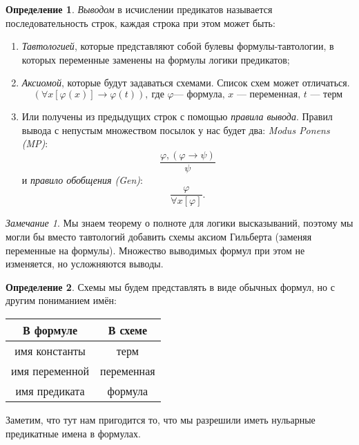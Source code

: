 \documentclass[12pt]{article}
\let\im\rightarrow
\theoremstyle{definition}
\newtheorem{definition}{Определение}[section]
\theoremstyle{plain}
\theoremstyle{remark}
\newtheorem*{remark}{Замечание}
\begin{document}
\begin{definition}
  \textit{Выводом} в исчислении предикатов называется
  последовательность строк, каждая строка при этом может быть:
  \begin{enumerate}
    \item \textit{Тавтологией}, которые представляют собой булевы
      формулы-тавтологии, в которых переменные заменены на формулы
      логики предикатов;

    \item \textit{Аксиомой}, которые будут задаваться схемами. Список
      схем может отличаться.
      \[
        (\forall x [\varphi(x)] \im \varphi(t)),\ \text{где $\varphi$
        --- формула, $x$ --- переменная, $t$ --- терм}
      \]

    \item Или получены из предыдущих строк с помощью \textit{правила
      вывода}. Правил вывода с непустым множеством посылок у нас будет
      два: \textit{Modus Ponens (MP)}:
      \[
        \frac{\varphi, (\varphi \im \psi)}{\psi}
      \]
      и \textit{правило обобщения (Gen)}:
      \[
        \frac{\varphi}{\forall x [\varphi]}.
      \]
  \end{enumerate}
\end{definition}

\begin{remark}
  Мы знаем теорему о полноте для логики высказываний,
  поэтому мы могли бы вместо тавтологий добавить схемы аксиом Гильберта
  (заменяя переменные на формулы). Множество выводимых формул при этом
  не изменяется, но усложняются выводы.
\end{remark}

\begin{definition}
  Схемы мы будем представлять в виде обычных формул, но с другим
  пониманием имён:
  \begin{center}
    \begin{tabular}{c|c}
      В формуле & В схеме \\\hline
      имя константы & терм \\\hline
      имя переменной & переменная \\\hline
      имя предиката & формула
    \end{tabular}
  \end{center}
\end{definition}

Заметим, что тут нам пригодится то, что мы разрешили иметь нульарные
предикатные имена в формулах.
\end{document}
